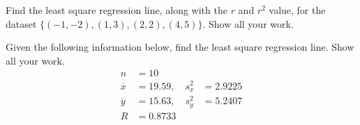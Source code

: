 \documentclass[11pt,letterpaper]{article}
\begin{document}

 Find the least square regression line, along with the $r$ and $r^2$ value, for the dataset $\{ (-1, -2), (1, 3), (2, 2), (4, 5) \}$. Show all your work. 



\newpage



 Given the following information below, find the least square regression line. Show all your work. 
	\[
	\begin{aligned}
	n&= 10 \\
	\overline{x}&= 19.59, \quad s_x^2&= 2.9225 \\
	\overline{y}&= 15.63, \quad s_y^2&= 5.2407 \\
	R&= 0.8733
	\end{aligned}
	\]



\newpage
\end{document}
